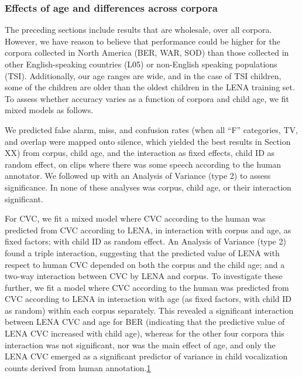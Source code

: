 \documentclass[english,floatsintext,man]{apa6}
\begin{document}
\subsubsection{Effects of age and differences across
corpora}\label{effects-of-age-and-differences-across-corpora}

The preceding sections include results that are wholesale, over all
corpora. However, we have reason to believe that performance could be
higher for the corpora collected in North America (BER, WAR, SOD) than
those collected in other English-speaking countries (L05) or non-English
speaking populations (TSI). Additionally, our age ranges are wide, and
in the case of TSI children, some of the children are older than the
oldest children in the LENA training set. To assess whether accuracy
varies as a function of corpora and child age, we fit mixed models as
follows.

We predicted false alarm, miss, and confusion rates (when all
\enquote{F} categories, TV, and overlap were mapped onto silence, which
yielded the best results in Section XX) from corpus, child age, and the
interaction as fixed effects, child ID as random effect, on clips where
there was some speech according to the human annotator. We followed up
with an Analysis of Variance (type 2) to assess significance. In none of
these analyses was corpus, child age, or their interaction significant.

For CVC, we fit a mixed model where CVC according to the human was
predicted from CVC according to LENA, in interaction with corpus and
age, as fixed factors; with child ID as random effect. An Analysis of
Variance (type 2) found a triple interaction, suggesting that the
predicted value of LENA with respect to human CVC depended on both the
corpus and the child age; and a two-way interaction between CVC by LENA
and corpus. To investigate these further, we fit a model where CVC
according to the human was predicted from CVC according to LENA in
interaction with age (as fixed factors, with child ID as random) within
each corpus separately. This revealed a significant interaction between
LENA CVC and age for BER (indicating that the predictive value of LENA
CVC increased with child age), whereas for the other four corpora this
interaction was not significant, nor was the main effect of age, and
only the LENA CVC emerged as a significant predictor of variance in
child vocalization counts derived from human
annotation.\href{For\%20both\%20BER\%20and\%20WAR,\%20the\%20variance\%20associated\%20to\%20the\%20child\%20ID\%20random\%20factor\%20was\%20zero.\%20This\%20suggests\%20a\%20mixed\%20model\%20was\%20not\%20necessary,\%20as\%20child\%20ID\%20is\%20not\%20explaining\%20any\%20additional\%20variance,\%20but\%20it\%20does\%20not\%20alter\%20the\%20interpretation\%20in\%20the\%20main\%20text.}{1}
\end{document}
